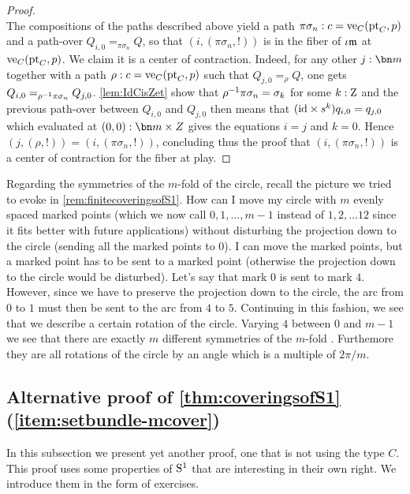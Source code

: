 \begin{proof}
\begin{displaymath}
  \end{displaymath}
  The compositions of the paths described above yield a path
  $\pi\sigma_n: c = \ve_C(\pt_C,p)$ and a path-over
  $Q_{i,0} =_{\pi\sigma_n} Q$, so that $(i,(\pi\sigma_n,!))$ is in the
  fiber of $\iota\mathfrak m$ at $\ve_C(\pt_C,p)$. We claim it is a center of
  contraction. Indeed, for any other $j:\bn m$ together with a path
  $\rho:c=\ve_C(\pt_C,p)$ such that $Q_{j,0}=_\rho Q$, one gets
  $Q_{i,0}=_{\rho^{-1} \pi\sigma_n}Q_{j,0}$. \cref{lem:IdCisZet} show
  that $\rho^{-1}\pi\sigma_n = \sigma_k$ for some $k:\mathrm{Z}$ and the
  previous path-over between $Q_{i,0}$ and $Q_{j,0}$ then means that
  $(\mathord{\mathrm{id}} \times s^k)q_{i,0}=q_{j,0}$ which evaluated at
  $(0,0):\bn m\times Z$ gives the equations $i=j$ and $k=0$. Hence
  $(j,(\rho,!)) = (i,(\pi\sigma_n,!))$, concluding thus the proof that
  $(i,(\pi\sigma_n,!))$ is a center of contraction for the fiber at
  play.

  \end{proof}

  \begin{remark}
    Regarding the symmetries of the $m$-fold \covering of the circle, recall the picture we tried to evoke in \cref{rem:finitecoveringsofS1}.  How can I move my circle with $m$ evenly spaced marked points  (which we now call $0,1,\dots, m-1$ instead of $1,2,\dots 12$ since it fits better with future applications) without disturbing the projection down to the circle (sending all the marked points to $0$).  I can move the marked points, but a marked point has to be sent to a marked point (otherwise the projection down to the circle would be disturbed).  Let's say that mark $0$ is sent to mark $4$.  However, since we have to preserve the projection down to the circle, the arc from $0$ to $1$ must then be sent to the arc from $4$ to $5$.  Continuing in this fashion, we see that we describe a certain rotation of the circle.  Varying $4$ between $0$ and $m-1$ we see that there are exactly $m$ different symmetries of the $m$-fold \covering.  Furthemore they are all rotations of the circle by an angle which is a multiple of $2\pi/m$.
  \end{remark}


\subsection*{Alternative proof of \cref{thm:coveringsofS1}(\ref{item:setbundle-mcover})}

In this subsection we present yet another proof, one that is not using the type $C$. 
This proof uses some properties of ${\mathrm{S}^1}$ that are interesting in their own right.
We introduce them in the form of exercises.


